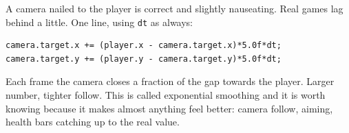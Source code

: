 A camera nailed to the player is correct and slightly nauseating. Real games lag
behind a little. One line, using \lstinline|dt| as always:

\begin{lstlisting}
camera.target.x += (player.x - camera.target.x)*5.0f*dt;
camera.target.y += (player.y - camera.target.y)*5.0f*dt;
\end{lstlisting}

Each frame the camera closes a fraction of the gap towards the player. Larger
number, tighter follow. This is called exponential smoothing and it is worth
knowing because it makes almost anything feel better: camera follow, aiming,
health bars catching up to the real value.

